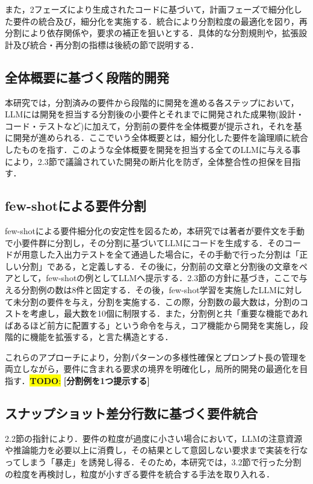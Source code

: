 \documentclass[submit,techrep,noauthor]{ipsj}
\newcommand{\todo}[1]{\colorbox{yellow}{{\bf TODO}:}{\color{red} {\textbf{[#1]}}}}
\begin{document}
また，2フェーズにより生成されたコードに基づいて，計画フェーズで細分化した要件の統合及び，細分化を実施する．統合により分割粒度の最適化を図り，再分割により依存関係や，要求の補正を狙いとする．具体的な分割規則や，拡張設計及び統合・再分割の指標は後続の節で説明する．


\subsection{全体概要に基づく段階的開発}
本研究では，分割済みの要件から段階的に開発を進める各ステップにおいて，LLMには開発を担当する分割後の小要件とそれまでに開発された成果物(設計・コード・テストなど)に加えて，分割前の要件を全体概要が提示され，それを基に開発が進められる．ここでいう全体概要とは，細分化した要件を論理順に統合したものを指す．このような全体概要を開発を担当する全てのLLMに与える事により，2.3節で議論されていた開発の断片化を防ぎ，全体整合性の担保を目指す．

\subsection{few-shotによる要件分割}
few-shotによる要件細分化の安定性を図るため，本研究では著者が要件文を手動で小要件群に分割し，その分割に基づいてLLMにコードを生成する．そのコードが用意した入出力テストを全て通過した場合に，その手動で行った分割は「正しい分割」である，と定義しする．その後に，分割前の文章と分割後の文章をペアとして，few-shotの例としてLLMへ提示する．2.3節の方針に基づき，ここで与える分割例の数は8件と固定する．その後，few-shot学習を実施したLLMに対して未分割の要件を与え，分割を実施する．この際，分割数の最大数は，分割のコストを考慮し，最大数を10個に制限する．また，分割例と共「重要な機能であればあるほど前方に配置する」という命令を与え，コア機能から開発を実施し，段階的に機能を拡張する，と言た構造とする．

これらのアプローチにより，分割パターンの多様性確保とプロンプト長の管理を両立しながら，要件に含まれる要求の境界を明確化し，局所的開発の最適化を目指す．\todo{分割例を1つ提示する}

\subsection{スナップショット差分行数に基づく要件統合}
2.2節の指針により．要件の粒度が過度に小さい場合において，LLMの注意資源や推論能力を必要以上に消費し，その結果として意図しない要求まで実装を行なってしまう「暴走」を誘発し得る．そのため，本研究では，3.2節で行った分割の粒度を再検討し，粒度が小すぎる要件を統合する手法を取り入れる．
\end{document}
